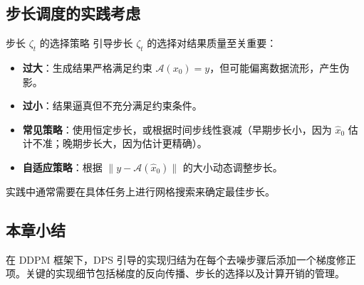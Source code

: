 \subsection{步长调度的实践考虑}

\begin{knowledgebox}{步长 $\zeta_t$ 的选择策略}
引导步长 $\zeta_t$ 的选择对结果质量至关重要：
\begin{itemize}
    \item \textbf{过大}：生成结果严格满足约束 $\mathcal{A}(x_0) = y$，但可能偏离数据流形，产生伪影。
    \item \textbf{过小}：结果逼真但不充分满足约束条件。
    \item \textbf{常见策略}：使用恒定步长，或根据时间步线性衰减（早期步长小，因为 $\hat{x}_0$ 估计不准；晚期步长大，因为估计更精确）。
    \item \textbf{自适应策略}：根据 $\| y - \mathcal{A}(\hat{x}_0) \|$ 的大小动态调整步长。
\end{itemize}
实践中通常需要在具体任务上进行网格搜索来确定最佳步长。
\end{knowledgebox}

\subsection{本章小结}

在 DDPM 框架下，DPS 引导的实现归结为在每个去噪步骤后添加一个梯度修正项。关键的实现细节包括梯度的反向传播、步长的选择以及计算开销的管理。


